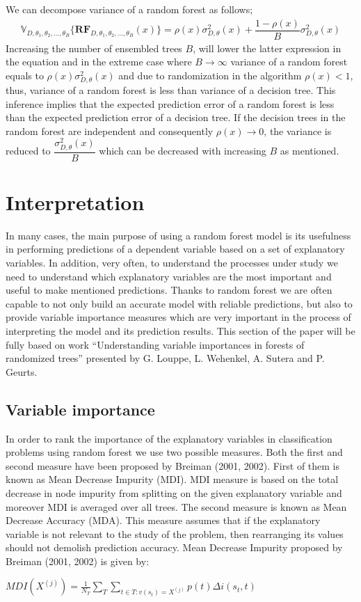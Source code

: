 We can decompose variance of a random forest as follows;
\begin{align}
\mathbb{V}_{D, \theta_{1}, \theta_{2},..., \theta_{B}}\{\boldsymbol{RF}_{D, \theta_{1},\theta_{2},..., \theta_{B}}(x) \}  = \rho(x)\sigma^2_{D,\theta}(x) + \dfrac{1-\rho(x)}{B}\sigma^2_{D,\theta}(x)
\end{align}
Increasing the number of ensembled trees $B$, will lower the latter expression in the equation and in the extreme case where $B \rightarrow \infty $ variance of a random forest equals to $\rho(x)\sigma^2_{D,\theta}(x)$ and due to randomization in the algorithm $\rho(x) < 1$, thus, variance of a random forest is less than variance of a decision tree. This inference implies that the expected prediction error of a random forest is less than the expected prediction error of a decision tree. If the decision trees in the random forest are independent and consequently $\rho(x) \rightarrow 0$, the variance is reduced to $\dfrac{\sigma^2_{D,\theta}(x)}{B}$ which can be decreased with increasing $B$ as mentioned.



\section{Interpretation}
In many cases, the main purpose of using a random forest model is its usefulness in performing predictions of a dependent variable based on a set of explanatory variables. In addition, very often, to understand the processes under study we need to understand which explanatory variables are the most important and useful to make mentioned predictions. Thanks to random forest we are often capable to not only build an accurate model with reliable predictions, but also to provide variable importance measures which are very important in the process of interpreting the model and its prediction results. This section of the paper will be fully based on work “Understanding variable importances in forests of randomized trees” presented by G. Louppe, L. Wehenkel, A. Sutera and P. Geurts.

\subsection{Variable importance}
In order to rank the importance of the explanatory variables in classification problems using random forest we use two possible measures. Both the first and second measure have been proposed by Breiman (2001, 2002). First of them is known as Mean Decrease Impurity (MDI). MDI measure is based on the total decrease in node impurity from splitting on the given explanatory variable and moreover MDI is averaged over all trees. The second measure is known as Mean Decrease Accuracy (MDA). This measure assumes that if the explanatory variable is not relevant to the study of the problem, then rearranging its values should not demolish prediction accuracy. Mean Decrease Impurity proposed by Breiman (2001, 2002) is given by: 
\begin{center}
$ MDI( X^{(j)} ) = \frac{1}{N_{T}}\displaystyle\sum_{T}  \displaystyle\sum_{t \in T: v(s_{t}) =  X^{(j)}  } p(t)\Delta i(s_{t}, t)$
\end{center}


